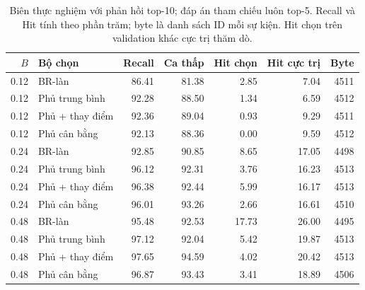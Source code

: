 \begin{table}[htbp]
\centering\small
\setlength{\tabcolsep}{3pt}
\caption{Biên thực nghiệm với phản hồi top-10; đáp án tham chiếu luôn top-5. Recall và Hit tính theo phần trăm; byte là danh sách ID mỗi sự kiện. Hit chọn trên validation khác cực trị thăm dò.}\label{tab:coverage-frontier-10}
\begin{tabular}{rlrrrrr}
\toprule
$B$ & Bộ chọn & Recall & Ca thấp & Hit chọn & Hit cực trị & Byte\\\midrule
0.12 & BR-làn & 86.41 & 81.38 & 2.85 & 7.04 & 4511\\
0.12 & Phủ trung bình & 92.28 & 88.50 & 1.34 & 6.59 & 4512\\
0.12 & Phủ + thay điểm & 92.36 & 89.04 & 0.93 & 9.29 & 4511\\
0.12 & Phủ cân bằng & 92.13 & 88.36 & 0.00 & 9.59 & 4512\\
0.24 & BR-làn & 92.85 & 90.85 & 8.65 & 17.05 & 4498\\
0.24 & Phủ trung bình & 96.12 & 92.31 & 3.76 & 16.23 & 4513\\
0.24 & Phủ + thay điểm & 96.38 & 92.44 & 5.99 & 16.17 & 4513\\
0.24 & Phủ cân bằng & 96.01 & 93.26 & 2.66 & 16.61 & 4510\\
0.48 & BR-làn & 95.48 & 92.53 & 17.73 & 26.00 & 4495\\
0.48 & Phủ trung bình & 97.12 & 92.04 & 5.42 & 19.87 & 4513\\
0.48 & Phủ + thay điểm & 97.65 & 94.59 & 4.02 & 20.42 & 4513\\
0.48 & Phủ cân bằng & 96.87 & 93.43 & 3.41 & 18.89 & 4506\\
\bottomrule
\end{tabular}
\end{table}

